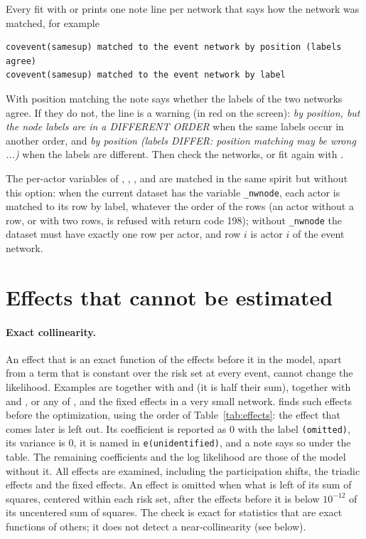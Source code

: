 Every fit with  or  prints one note line per network that says how the network was matched, for example
\begin{lstlisting}
covevent(samesup) matched to the event network by position (labels agree)
covevent(samesup) matched to the event network by label
\end{lstlisting}
With position matching the note says whether the labels of the two networks agree. If they do not, the line is a warning (in red on the screen): \emph{by position, but the node labels are in a DIFFERENT ORDER} when the same labels occur in another order, and \emph{by position (labels DIFFER: position matching may be wrong ...)} when the labels are different. Then check the networks, or fit again with .

The per-actor variables of , , ,  and  are matched in the same spirit but without this option: when the current dataset has the variable \texttt{\_nwnode}, each actor is matched to its row by label, whatever the order of the rows (an actor without a row, or with two rows, is refused with return code 198); without \texttt{\_nwnode} the dataset must have exactly one row per actor, and row $i$ is actor $i$ of the event network.

\section{Effects that cannot be estimated}\label{sec:collinear}

\paragraph{Exact collinearity.} An effect that is an exact function of the effects before it in the model, apart from a term that is constant over the risk set at every event, cannot change the likelihood. Examples are  together with  and  (it is half their sum),  together with  and , or any of ,  and the fixed effects in a very small network. \nwrem{} finds such effects before the optimization, using the order of Table~\ref{tab:effects}: the effect that comes later is left out. Its coefficient is reported as 0 with the label \texttt{(omitted)}, its variance is 0, it is named in \texttt{e(unidentified)}, and a note says so under the table. The remaining coefficients and the log likelihood are those of the model without it. All effects are examined, including the participation shifts, the triadic effects and the fixed effects. An effect is omitted when what is left of its sum of squares, centered within each risk set, after the effects before it is below $10^{-12}$ of its uncentered sum of squares. The check is exact for statistics that are exact functions of others; it does not detect a near-collinearity (see below).

